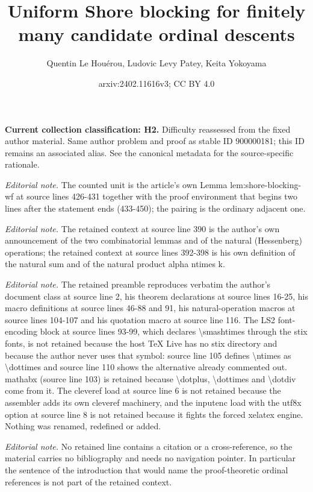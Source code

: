 \documentclass{article}
\title{Uniform Shore blocking for finitely many candidate ordinal descents}
\author{Quentin Le Houérou, Ludovic Levy Patey, Keita Yokoyama}
\date{arxiv:2402.11616v3; CC BY 4.0}
\numberwithin{theorem}{section}
\begin{document}
\maketitle
\par\medskip\noindent\textbf{Current collection classification: H2.} Difficulty reassessed from the fixed author material. Same author problem and proof as stable ID 900000181; this ID remains an associated alias. See the canonical metadata for the source-specific rationale.\par\medskip

\noindent\textit{Editorial note.} The counted unit is the article's own Lemma lem:shore-blocking-wf at source lines 426-431 together with the proof environment that begins two lines after the statement ends (433-450); the pairing is the ordinary adjacent one.\par\medskip
\noindent\textit{Editorial note.} The retained context at source line 390 is the author's own announcement of the two combinatorial lemmas and of the natural (Hessenberg) operations; the retained context at source lines 392-398 is his own definition of the natural sum and of the natural product alpha ntimes k.\par\medskip
\noindent\textit{Editorial note.} The retained preamble reproduces verbatim the author's document class at source line 2, his theorem declarations at source lines 16-25, his macro definitions at source lines 46-88 and 91, his natural-operation macros at source lines 104-107 and his quotation macro at source line 116. The LS2 font-encoding block at source lines 93-99, which declares \textbackslash{}smashtimes through the stix fonts, is not retained because the host TeX Live has no stix directory and because the author never uses that symbol: source line 105 defines \textbackslash{}ntimes as \textbackslash{}dottimes and source line 110 shows the alternative already commented out. mathabx (source line 103) is retained because \textbackslash{}dotplus, \textbackslash{}dottimes and \textbackslash{}dotdiv come from it. The cleveref load at source line 6 is not retained because the assembler adds its own cleveref machinery, and the inputenc load with the utf8x option at source line 8 is not retained because it fights the forced xelatex engine. Nothing was renamed, redefined or added.\par\medskip
\noindent\textit{Editorial note.} No retained line contains a citation or a cross-reference, so the material carries no bibliography and needs no navigation pointer. In particular the sentence of the introduction that would name the proof-theoretic ordinal references is not part of the retained context.\par\medskip
\end{document}

